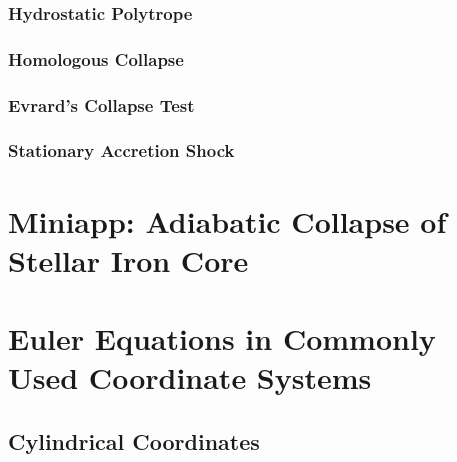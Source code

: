 \documentclass[10pt,preprint]{aastex}
\begin{document}
\subsubsection{Hydrostatic Polytrope}

\subsubsection{Homologous Collapse}

\subsubsection{Evrard's Collapse Test}

\subsubsection{Stationary Accretion Shock}

\section{Miniapp: Adiabatic Collapse of Stellar Iron Core}




\appendix

\section{Euler Equations in Commonly Used Coordinate Systems}
\label{app:CurvilinearEuler}

\subsection{Cylindrical Coordinates}
\end{document}

